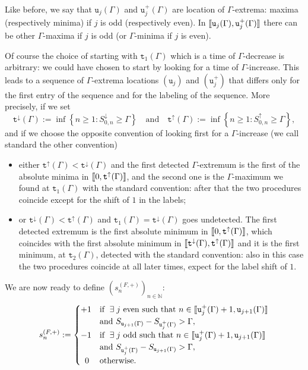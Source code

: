 \documentclass[AHL,Unicode,longabstracts,published]{cedram}
\newcommand{\bbN}{\mathbb{N}}
\newcommand{\gG}{\Gamma}
\renewcommand*\ss{\mathtt{u}}
\newcommand{\ttt}{\mathtt{t}}
\newcommand{\tu}{\ss}
\newcommand{\tuplus}{\ss^+}
\let\oldexists\exists
\renewcommand*{\exists}{\mathrel{\oldexists}}
\newcommand{\llbracket}{\mathopen{[\mkern -2.7mu[}}
\newcommand{\rrbracket}{\mathclose{]\mkern -2.7mu]}}
\newcommand{\lbra}{\llbracket}
\newcommand{\rbra}{\rrbracket}
\begin{document}
Like before, we say that $\tu_{j}(\gG)$ and $\tu_{j}^+(\gG)$ are location of $\gG$-extrema: maxima (respectively minima) if $j$ is odd (respectively even). In $\lbra \tu_{j}(\gG), \tu_{j}^+(\gG)\rbra$ there can be other $\gG$-maxima if $j$ is odd (or $\gG$-minima if $j$ is even).


\begin{rema}\label{rem:arbitrary-choice}
Of course the choice of starting with $\ttt_1(\gG)$ which is a time of $\gG$-decrease is arbitrary: we could have chosen to start by looking for a time of $\gG$-increase. This leads to a sequence of $\gG$-extrema locations $(\tu_j)$ and $(\tuplus_j)$ that differs only for the first entry of the sequence and for the labeling of the sequence. More precisely, if we set
\begin{equation}\label{eq:t-down-up}
\ttt^\downarrow(\gG) := \inf\left\{n\ge 1: S^\downarrow_{0,n} \ge \gG\right\}
\quad \text{and}\quad \ttt^\uparrow(\gG):= \inf\left\{n\ge 1: S^\uparrow_{0,n} \ge \gG\right\},
\end{equation}
and if we choose the opposite convention of looking first for a $\gG$-increase (we call standard the other convention)
\begin{itemize}
\item either $\ttt^\uparrow(\gG)< \ttt^\downarrow(\gG)$ and the first detected $\gG$-extremum is the first of the absolute minima in $\lbra 0,\ttt^\uparrow(\gG)\rbra$, and the second one is the $\gG$-maximum we found at $\ttt_1(\gG)$ with the standard convention: after that the two procedures coincide except for the shift of $1$ in the labels;
\item or $ \ttt^\downarrow(\gG)< \ttt^\uparrow(\gG)$ and $\ttt_1(\gG)=\ttt^\downarrow(\gG)$ goes undetected. The first detected extremum is the first absolute minimum in $\lbra 0, \ttt^\uparrow(\gG)\rbra$, which coincides with the first absolute minimum in $\lbra \ttt^\downarrow(\gG), \ttt^\uparrow(\gG)\rbra$ and it is the first minimum, at $\ttt_2(\gG)$, detected with the standard convention: also in this case the two procedures coincide at all later times, expect for the label shift of $1$.
\end{itemize}
\end{rema}

We are now ready to define $(s_n^{(F, +)})_{n \in \bbN}$:
\begin{equation}\label{eq:sF+}
s_n^{(F, +)}:=
\begin{cases}
+1 & \text{if } \exists j \text{ even such that } n \in \lbra\tu^+_j(\gG)+1, \tu_{j+1}(\gG)\rbra\\
&\text{and } S_{\tu_{j+1}(\gG)}-S_{\tu^+_j(\gG)} > \gG,
\\
-1 & \text{if } \exists j \text{ odd such that } n \in \lbra\tu^+_j(\gG)+1, \tu_{j+1}(\gG)\rbra\\
&\text{and } S_{\tu^+_j(\gG)}-S_{\tu_{j+1}(\gG)}> \gG,
\\ \phantom{1} 0 & \text{otherwise.}
\end{cases}
\end{equation}
\end{document}

